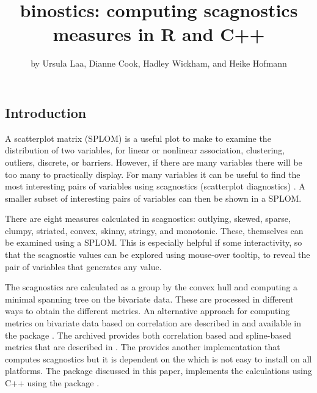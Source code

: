 \title{binostics: computing scagnostics measures in R and C++}
\author{by Ursula Laa, Dianne Cook, Hadley Wickham, and Heike Hofmann}

\maketitle


\hypertarget{introduction}{%
\subsection{Introduction}\label{introduction}}

A scatterplot matrix (SPLOM) is a useful plot to make to examine the
distribution of two variables, for linear or nonlinear association,
clustering, outliers, discrete, or barriers. However, if there are many
variables there will be too many to practically display. For many
variables it can be useful to find the most interesting pairs of
variables using scagnostics (scatterplot diagnostics)
\citep[\citet{WW08}]{scag}. A smaller subset of interesting pairs of
variables can then be shown in a SPLOM.

There are eight measures calculated in scagnostics: outlying, skewed,
sparse, clumpy, striated, convex, skinny, stringy, and monotonic. These,
themselves can be examined using a SPLOM. This is especially helpful if
some interactivity, so that the scagnostic values can be explored using
mouse-over tooltip, to reveal the pair of variables that generates any
value.

The scagnostics are calculated as a group by the convex hull and
computing a minimal spanning tree on the bivariate data. These are
processed in different ways to obtain the different metrics. An
alternative approach for computing metrics on bivariate data based on
correlation are described in \citet{Reshef1518} and available in the
 package \citep{minerva}. The archived
 \citep{mbgraphic} provides both correlation based
and spline-based metrics that are described in \citep{Grimm2016}. The
 \citep{LWscagR} provides another implementation
that computes scagnostics but it is dependent on the 
which is not easy to install on all platforms. The 
package discussed in this paper, implements the calculations using C++
using the  package \citep{Rcpp}.

